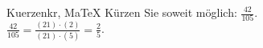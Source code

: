 \begin{MAufgabe}{Kuerzen}{kr, MaTeX}
K\"urzen Sie soweit m\"oglich: $\frac{42}{105}$.\\ 
\ifLsg\MLoesung
\quad $\frac{42}{105}=\frac{(21)\cdot(2)}{(21)\cdot(5)}=\frac{2}{5}$.\else\relax\fi
 \end{MAufgabe}